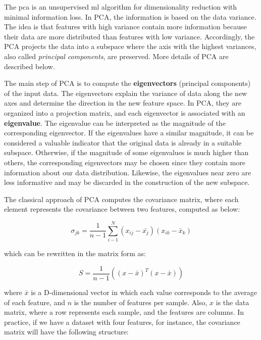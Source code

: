 The \acf{pca} \citep{pca} is an unsupervised \acl{ml} algorithm for dimensionality reduction with minimal information loss. In PCA, the information is based on the data variance. The idea is that features with high variance contain more information because their data are more distributed than features with low variance. Accordingly, the PCA projects the data into a subspace where the axis with the highest variances, also called \textit{principal components}, are preserved. More details of PCA are described below.

The main step of PCA is to compute the \textbf{eigenvectors} (principal components) of the input data. The eigenvectors explain the variance of data along the new axes and determine the direction in the new feature space. In PCA, they are organized into a projection matrix, and each eigenvector is associated with an \textbf{eigenvalue}. The eigenvalue can be interpreted as the magnitude of the corresponding eigenvector. If the eigenvalues have a similar magnitude, it can be considered a valuable indicator that the original data is already in a suitable subspace. Otherwise, if the magnitude of some eigenvalues is much higher than others, the corresponding eigenvectors may be chosen since they contain more information about our data distribution. Likewise, the eigenvalues near zero are less informative and may be discarded in the construction of the new subspace. 

The classical approach of PCA computes the covariance matrix, where each element represents the covariance between two features, computed as below:

\begin{equation}
\label{eq:covariance}
\sigma_{jk} = \frac{1}{n-1}\sum_{i-1}^{N}(x_{ij} - \bar{x_j})(x_{ik} - \bar{x}_k)
\end{equation}

\noindent
which can be rewritten in the matrix form as:

\begin{equation}
\label{eq:covariance2}
S = \frac{1}{n-1}((x - \bar{x})^T(x - \bar{x}))
\end{equation}

\noindent
where $\bar{x}$ is a D-dimensional vector in which each value corresponds to the average of each feature, and $n$ is the number of features per sample. Also, $x$ is the data matrix, where a row represents each sample, and the features are columns. In practice, if we have a dataset with four features, for instance, the covariance matrix will have the following structure:

